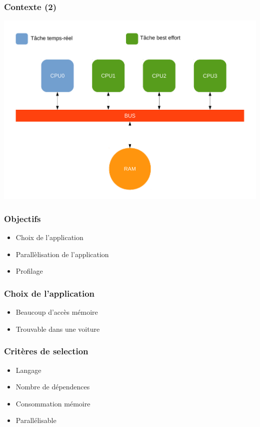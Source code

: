 \begin{frame}
\frametitle{Contexte (2)}
\begin{center}
  \includegraphics[scale=0.3]{include/archi.pdf}
\end{center}
\end{frame}

\begin{frame}
\frametitle{Objectifs}
\begin{itemize}
  \item Choix de l'application
  \item Parallèlisation de l'application
  \item Profilage
\end{itemize}
\end{frame}

\begin{frame}
\frametitle{Choix de l'application}
\begin{itemize}
  \item Beaucoup d'accès mémoire
  \item Trouvable dans une voiture
\end{itemize}
\end{frame}

\begin{frame}
\frametitle{Critères de selection}
\begin{itemize}
  \item Langage
  \item Nombre de dépendences
  \item Consommation mémoire
  \item Parallélisable
\end{itemize}
\end{frame}



